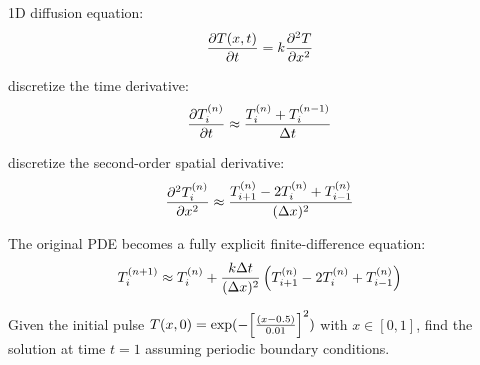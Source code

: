 \newcommand{\tni}{\ensuremath{T^{(n)}_i}}
\begin{frame}{}
  1D diffusion equation:
  \[
    {\partial T(x,t)\over\partial t}=k{\partial^2 T\over\partial x^2}
  \]

  discretize the time derivative:
  \[
    {\partial\tni\over\partial t}\approx{\tni+T^{(n-1)}_i\over\Delta t}
  \]

  discretize the second-order spatial derivative:
  \[
    {\partial^2\tni\over\partial x^2}\approx{T^{(n)}_{i+1}-2T^{(n)}_i+T^{(n)}_{i-1}\over(\Delta x)^2}
  \]

  The original PDE becomes a fully explicit finite-difference equation:
  \[
    T^{(n+1)}_i\approx T^{(n)}_i+{k\Delta t\over(\Delta x)^2}\left(T^{(n)}_{i+1}-2T^{(n)}_i+T^{(n)}_{i-1}\right)
  \]

  Given the initial pulse $T(x,0)=\exp(-{\left[(x-0.5)\over 0.01\right]}^2)$ with $x\in[0,1]$, find the
  solution at time $t=1$ assuming periodic boundary conditions.

\end{frame}
